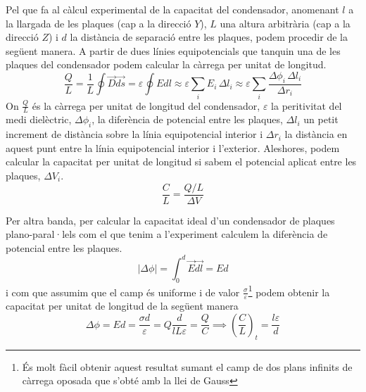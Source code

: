 \documentclass[11pt]{article}
\begin{document}
Pel que fa al càlcul experimental de la capacitat del condensador, anomenant $l$ a la llargada de les plaques (cap a la direcció $Y$), $L$ una altura arbitrària (cap a la direcció $Z$) i $d$ la distància de separació entre les plaques, podem procedir de la següent manera.
A partir de dues línies equipotencials que tanquin una de les plaques del condensador podem calcular la càrrega per unitat de longitud.
\begin{equation}
    \frac{Q}{L} = \frac{1}{L}\oint\vec{D}\vec{ds}=\varepsilon\oint Edl\approx \varepsilon \sum_i E_i \, \Delta l_i \approx \varepsilon \sum_i \frac{\Delta \phi_i \, \Delta l_i}{\Delta r_i}
    \label{eq: Q}
\end{equation}
On $\frac{Q }{L }$ és la càrrega per unitat de longitud del condensador, $\varepsilon$ la peritivitat del medi dielèctric, $\Delta \phi_i$, la diferència de potencial entre les plaques, $\Delta l_i$ un petit increment de distància sobre la línia equipotencial interior i $\Delta r_i$ la distància en aquest punt entre la línia equipotencial interior i l'exterior.
Aleshores, podem calcular la capacitat per unitat de longitud si sabem el potencial aplicat entre les plaques, $\Delta V_i$.
\begin{equation}
    \frac{C}{L}=\frac{Q/L}{\Delta V}
    \label{eq: C}
\end{equation}

Per altra banda, per calcular la capacitat ideal d'un condensador de plaques plano-paral·lels com el que tenim a l'experiment calculem la diferència de potencial entre les plaques.
\begin{equation}
    |\Delta\phi|=\int_{0}^{d} \vec{E}\vec{dl}= Ed
\end{equation}
i com que assumim que el camp és uniforme i de valor $\frac{\sigma}{\varepsilon}$\footnote{És molt fàcil obtenir aquest resultat sumant el camp de dos plans infinits de càrrega oposada que s'obté amb la llei de Gauss} podem obtenir la capacitat per unitat de longitud de la següent manera
\begin{equation}
    \Delta\phi=Ed=\frac{\sigma d}{\varepsilon}
    =Q\frac{d}{lL\varepsilon}=\frac{Q}{C}\implies (\frac{C}{L})_t=\frac{l\varepsilon}{d}
    \label{eq: c_t}
\end{equation}
\end{document}

